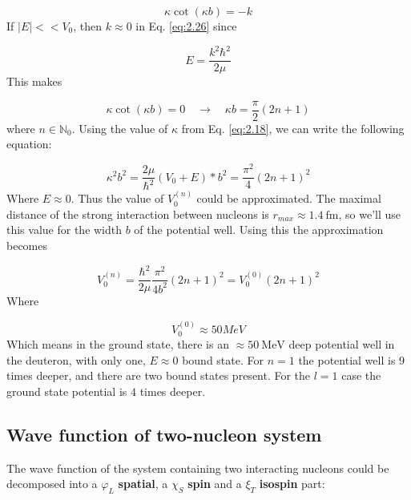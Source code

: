 \begin{equation} \label{eq:2.26}
	\kappa \cot \left( \kappa b \right)
	=
	-k
\end{equation}
If $\left| E \right| << V_{0}$, then $k \approx 0$ in Eq. \eqref{eq:2.26} since

\begin{equation*}
	E
	=
	\frac{k^{2} \hbar^{2}}{2 \mu}
\end{equation*}
This makes

\begin{equation} \label{eq:2.27}
	\kappa \cot \left( \kappa b \right)
	=
	0
	\quad \longrightarrow \quad
	\kappa b
	=
	\frac{\pi}{2} \left( 2n + 1 \right)
\end{equation}
where $n \in \mathbb{N}_{0}$. Using the value of $\kappa$ from Eq. \eqref{eq:2.18}, we can write the following equation:

\begin{equation} \label{eq:2.28}
	\kappa^{2} b^{2}
	=
	\frac{2 \mu}{\hbar^{2}} \left( V_{0} + E \right) * b^{2}
	=
	\frac{\pi^{2}}{4} \left( 2n + 1 \right)^{2}
\end{equation}
Where $E \approx 0$. Thus the value of $V_{0}^{\left( n \right)}$ could be approximated. The maximal distance of the strong interaction between nucleons is $r_{max} \approx 1.4\ \text{fm}$, so we'll use this value for the width $b$ of the potential well. Using this the approximation becomes

\begin{equation} \label{eq:2.29}
	V_{0}^{\left( n \right)}
	=
	\frac{\hbar^{2}}{2 \mu} \frac{\pi^{2}}{4 b^{2}} \left( 2n + 1 \right)^{2}
	=
	V_{0}^{\left( 0 \right)} \left( 2n + 1 \right)^{2}
\end{equation}
Where

\begin{equation} \label{eq:2.30}
	V_{0}^{\left( 0 \right)}
	\approx
	50 MeV
\end{equation}
Which means in the ground state, there is an $\approx 50\ \text{MeV}$ deep potential well in the deuteron, with only one, $E \approx 0$ bound state. For $n=1$ the potential well is $9$ times deeper, and there are two bound states present. For the $l=1$ case the ground state potential is $4$ times deeper.

\subsection{Wave function of two-nucleon system}
The wave function of the system containing two interacting nucleons could be decomposed into a $\varphi_{L}$ \textbf{spatial}, a $\chi_{S}$ \textbf{spin} and a $\xi_{T}$ \textbf{isospin} part:

